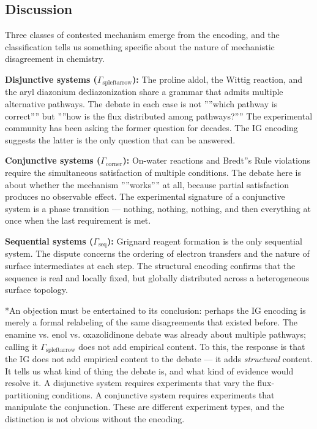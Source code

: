 \documentclass[12pt,a4paper]{article}
\begin{document}
\subsection{Discussion}

Three classes of contested mechanism emerge from the encoding, and the classification tells us something specific about the nature of mechanistic disagreement in chemistry.

\textbf{Disjunctive systems ($\Gamma_{\text{spleftarrow}}$):} The proline aldol, the Wittig reaction, and the aryl diazonium dediazonization share a grammar that admits multiple alternative pathways. The debate in each case is not ''''which pathway is correct'''' but ''''how is the flux distributed among pathways?'''' The experimental community has been asking the former question for decades. The IG encoding suggests the latter is the only question that can be answered.

\textbf{Conjunctive systems ($\Gamma_{\text{corner}}$):} On-water reactions and Bredt''s Rule violations require the simultaneous satisfaction of multiple conditions. The debate here is about whether the mechanism ''''works'''' at all, because partial satisfaction produces no observable effect. The experimental signature of a conjunctive system is a phase transition --- nothing, nothing, nothing, and then everything at once when the last requirement is met.

\textbf{Sequential systems ($\Gamma_\textrm{seq}$):} Grignard reagent formation is the only sequential system. The dispute concerns the ordering of electron transfers and the nature of surface intermediates at each step. The structural encoding confirms that the sequence is real and locally fixed, but globally distributed across a heterogeneous surface topology.

*An objection must be entertained to its conclusion: perhaps the IG encoding is merely a formal relabeling of the same disagreements that existed before. The enamine vs. enol vs. oxazolidinone debate was already about multiple pathways; calling it $\Gamma_{\text{spleftarrow}}$ does not add empirical content. To this, the response is that the IG does not add empirical content to the debate --- it adds \emph{structural} content. It tells us what kind of thing the debate is, and what kind of evidence would resolve it. A disjunctive system requires experiments that vary the flux-partitioning conditions. A conjunctive system requires experiments that manipulate the conjunction. These are different experiment types, and the distinction is not obvious without the encoding.
\end{document}
